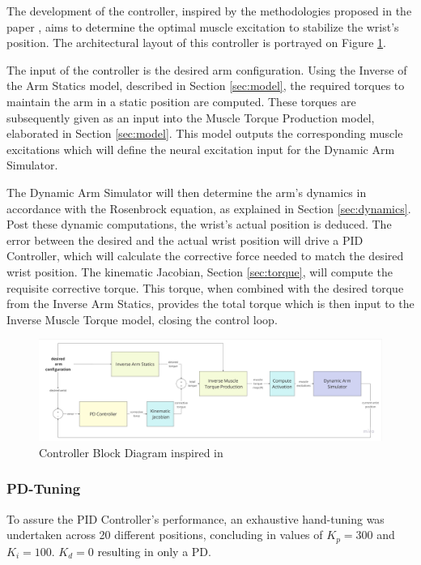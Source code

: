 The development of the controller, inspired by the methodologies proposed in the paper \cite{QSC}, aims to determine the optimal muscle excitation to stabilize the wrist's position. The architectural layout of this controller is portrayed on Figure \ref{fig:BDC}.

The input of the controller is the desired arm configuration. Using the Inverse of the Arm Statics model, described in Section \ref{sec:model}, the required torques to maintain the arm in a static position are computed. These torques are subsequently given as an input into the Muscle Torque Production model, elaborated in Section \ref{sec:model}. This model outputs the corresponding muscle excitations which will define the neural excitation input for the Dynamic Arm Simulator. 

The Dynamic Arm Simulator will then determine the arm's dynamics in accordance with the Rosenbrock equation, as explained in Section \ref{sec:dynamics}. Post these dynamic computations, the wrist's actual position is deduced. The error between the desired and the actual wrist position will drive a PID Controller, which will calculate the corrective force needed to match the desired wrist position. The kinematic Jacobian, Section \ref{sec:torque}, will compute the requisite corrective torque. This torque, when combined with the desired torque from the Inverse Arm Statics, provides the total torque which is then input to the Inverse Muscle Torque model, closing the control loop. 


\begin{figure}[h!]
    \centering
    \includegraphics[width=1\textwidth]{Pictures/Controller/controller-diagram.jpg}
    \caption{Controller Block Diagram inspired in \cite{QSC}}
    \label{fig:BDC}
\end{figure}

\subsubsection{PD-Tuning}
To assure the PID Controller's performance, an exhaustive hand-tuning was undertaken across 20 different positions, concluding in values of \(K_p = 300\) and \(K_i = 100\). \(K_d = 0\) resulting in only a PD. 

